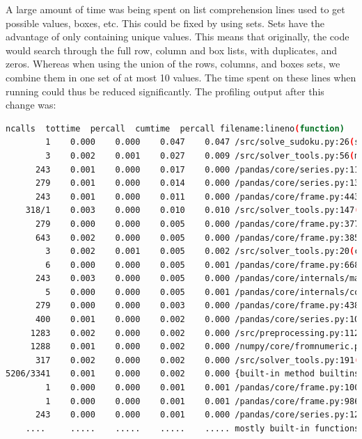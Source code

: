 \documentclass[12pt]{report} %
\begin{document}
A large amount of time was being spent on list comprehension lines used to get possible values, boxes, etc. This could be fixed by using sets. Sets have the advantage of only containing unique values\cite{freecodecamp_python_set_vs_list}. This means that originally, the code would search through the full row, column and box lists, with duplicates, and zeros. Whereas when using the union of the rows, columns, and boxes sets, we combine them in one set of at most 10 values. The time spent on these lines when running could thus be reduced significantly. The profiling output after this change was:

\begin{lstlisting}[language=Bash, caption={Profiling output after list comprehension improvements}, basicstyle=\tiny]
   ncalls  tottime  percall  cumtime  percall filename:lineno(function)
        1    0.000    0.000    0.047    0.047 /src/solve_sudoku.py:26(solve_sudoku)
        3    0.002    0.001    0.027    0.009 /src/solver_tools.py:56(markup)
      243    0.001    0.000    0.017    0.000 /pandas/core/series.py:1180(__setitem__)
      279    0.001    0.000    0.014    0.000 /pandas/core/series.py:1396(_maybe_update_cacher)
      243    0.001    0.000    0.011    0.000 /pandas/core/frame.py:4430(_maybe_cache_changed)
    318/1    0.003    0.000    0.010    0.010 /src/solver_tools.py:147(backtrack_alg)
      279    0.000    0.000    0.005    0.000 /pandas/core/frame.py:3779(_ixs)
      643    0.002    0.000    0.005    0.000 /pandas/core/frame.py:3856(__getitem__)
        3    0.002    0.001    0.005    0.002 /src/solver_tools.py:20(check_sudoku)
        6    0.000    0.000    0.005    0.001 /pandas/core/frame.py:668(__init__)
      243    0.003    0.000    0.005    0.000 /pandas/core/internals/managers.py:1045(iset)
        5    0.000    0.000    0.005    0.001 /pandas/core/internals/construction.py:423(dict_to_mgr)
      279    0.000    0.000    0.003    0.000 /pandas/core/frame.py:4387(_box_col_values)
      400    0.001    0.000    0.002    0.000 /pandas/core/series.py:1016(__getitem__)
     1283    0.002    0.000    0.002    0.000 /src/preprocessing.py:112(box)
     1288    0.001    0.000    0.002    0.000 /numpy/core/fromnumeric.py:1768(ravel)
      317    0.002    0.000    0.002    0.000 /src/solver_tools.py:191(<listcomp>)
5206/3341    0.001    0.000    0.002    0.000 {built-in method builtins.len}
        1    0.000    0.000    0.001    0.001 /pandas/core/frame.py:10039(map)
        1    0.000    0.000    0.001    0.001 /pandas/core/frame.py:9867(apply)
      243    0.000    0.000    0.001    0.000 /pandas/core/series.py:1270(_set_with_engine)
    ....     .....    .....    .....    ..... mostly built-in functions of packages

\end{lstlisting}
\end{document}
